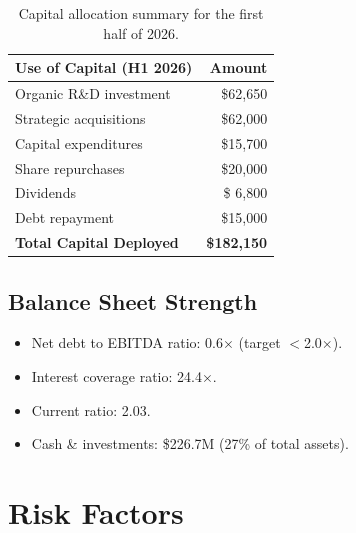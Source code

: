 \documentclass[
    language=english,
    doctype=financial-report,
    institution=none,
]{../../omnilatex}
\begin{document}
\begin{table}[h]
    \centering
    \begin{tabular}{lr}
        \toprule
        \textbf{Use of Capital (H1 2026)} & \textbf{Amount} \\
        \midrule
        Organic R\&D investment             & \$62,650 \\
        Strategic acquisitions              & \$62,000 \\
        Capital expenditures               & \$15,700 \\
        Share repurchases                  & \$20,000 \\
        Dividends                          & \$ 6,800 \\
        Debt repayment                     & \$15,000 \\
        \midrule
        \textbf{Total Capital Deployed}    & \textbf{\$182,150} \\
        \bottomrule
    \end{tabular}
    \caption{Capital allocation summary for the first half of 2026.}
\end{table}

\subsection{Balance Sheet Strength}

\begin{itemize}
    \item Net debt to EBITDA ratio: 0.6$\times$ (target $<$2.0$\times$).
    \item Interest coverage ratio: 24.4$\times$.
    \item Current ratio: 2.03.
    \item Cash \& investments: \$226.7M (27\% of total assets).
\end{itemize}

\section{Risk Factors}
\end{document}
